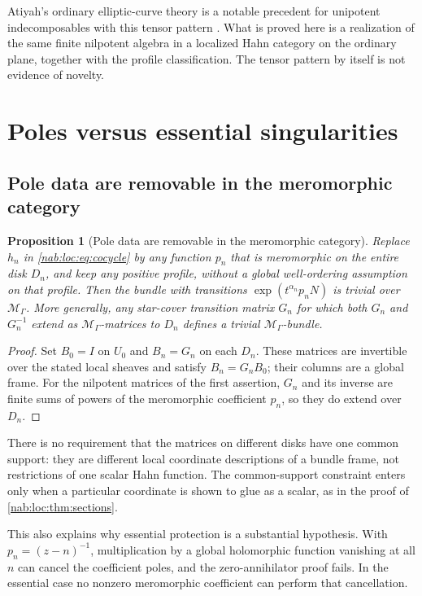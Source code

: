 \documentclass[11pt,letterpaper]{article}
\newtheorem{proposition}[proposition]{Proposition}
\theoremstyle{definition}
\theoremstyle{remark}
\newcommand{\MM}{\mathscr M_\Gamma}
\numberwithin{equation}{section}
\begin{document}
Atiyah's ordinary elliptic-curve theory is a notable precedent for unipotent
indecomposables with this tensor pattern \cite{Atiyah}. What is proved here is
a realization of the same finite nilpotent algebra in a localized Hahn category
on the ordinary plane, together with the profile classification. The tensor
pattern by itself is not evidence of novelty.

\section{Poles versus essential singularities}\label{nab:loc:sec:sharpness}

\subsection{Pole data are removable in the meromorphic category}

\begin{proposition}[Pole data are removable in the meromorphic category]
\label{nab:loc:prop:poles}
Replace $h_n$ in \eqref{nab:loc:eq:cocycle} by any function $p_n$ that is
meromorphic on the entire disk $D_n$, and keep any positive profile, without a
global well-ordering assumption on that profile. Then the bundle with
transitions $\exp(t^{\alpha_n}p_nN)$ is trivial over $\MM$. More generally,
any star-cover transition matrix $G_n$ for which both $G_n$ and $G_n^{-1}$
extend as $\MM$-matrices to $D_n$ defines a trivial $\MM$-bundle.
\end{proposition}

\begin{proof}
Set $B_0=I$ on $U_0$ and $B_n=G_n$ on each $D_n$. These matrices are invertible
over the stated local sheaves and satisfy $B_n=G_nB_0$; their columns are a
global frame. For the nilpotent matrices of the first assertion, $G_n$ and its
inverse are finite sums of powers of the meromorphic coefficient $p_n$, so they
do extend over $D_n$.
\end{proof}

There is no requirement that the matrices on different disks have one common
support: they are different local coordinate descriptions of a bundle frame,
not restrictions of one scalar Hahn function. The common-support constraint
enters only when a particular coordinate is shown to glue as a scalar, as in the
proof of \cref{nab:loc:thm:sections}.

This also explains why essential protection is a substantial hypothesis. With
$p_n=(z-n)^{-1}$, multiplication by a global holomorphic function vanishing at
all $n$ can cancel the coefficient poles, and the zero-annihilator proof fails.
In the essential case no nonzero meromorphic coefficient can perform that
cancellation.
\end{document}
